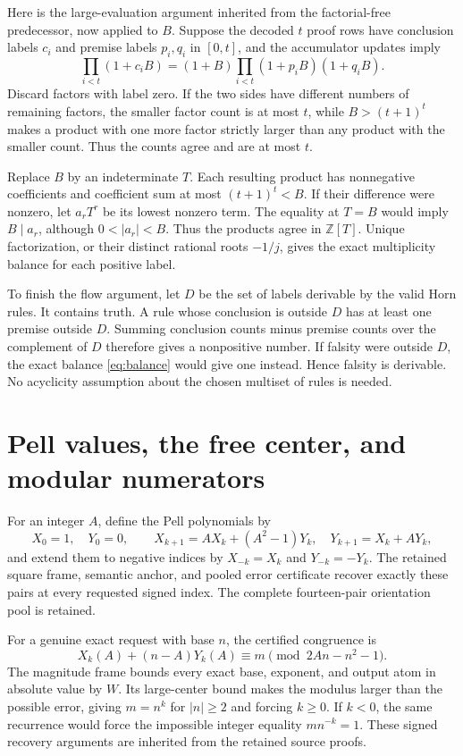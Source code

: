 \documentclass[11pt]{article}
\theoremstyle{remark}\newtheorem{remark}[theorem]{Remark}
\newcommand{\Z}{\mathbb Z}\newcommand{\N}{\mathbb N}
\newcommand{\abs}[1]{\lvert #1\rvert}
\begin{document}
Here is the large-evaluation argument inherited from the factorial-free
predecessor, now applied to $B$. Suppose the decoded $t$ proof rows
have conclusion labels $c_i$ and premise labels $p_i,q_i$ in $[0,t]$,
and the accumulator updates imply
\begin{equation}\label{eq:balance}
 \prod_{i<t}(1+c_iB)
 =(1+B)\prod_{i<t}(1+p_iB)(1+q_iB).
\end{equation}
Discard factors with label zero. If the two sides have different numbers
of remaining factors, the smaller factor count is at most $t$, while
$B>(t+1)^t$ makes a product with one more factor strictly larger than
any product with the smaller count. Thus the counts agree and are at
most $t$.

Replace $B$ by an indeterminate $T$. Each resulting product has
nonnegative coefficients and coefficient sum at most $(t+1)^t<B$.
If their difference were nonzero, let $a_rT^r$ be its lowest nonzero
term. The equality at $T=B$ would imply $B\mid a_r$, although
$0<\abs{a_r}<B$. Thus the products agree in $\Z[T]$. Unique
factorization, or their distinct rational roots $-1/j$, gives the
exact multiplicity balance for each positive label.

To finish the flow argument, let $D$ be the set of labels derivable by
the valid Horn rules. It contains truth. A rule whose conclusion is
outside $D$ has at least one premise outside $D$. Summing conclusion
counts minus premise counts over the complement of $D$ therefore gives
a nonpositive number. If falsity were outside $D$, the exact balance
\eqref{eq:balance} would give one instead. Hence falsity is derivable.
No acyclicity assumption about the chosen multiset of rules is needed.

\section{Pell values, the free center, and modular numerators}

For an integer $A$, define the Pell polynomials by
\[
 X_0=1,\quad Y_0=0,\qquad
 X_{k+1}=AX_k+(A^2-1)Y_k,\quad Y_{k+1}=X_k+AY_k,
\]
and extend them to negative indices by $X_{-k}=X_k$ and $Y_{-k}=-Y_k$.
The retained square frame, semantic anchor, and pooled error certificate
recover exactly these pairs at every requested signed index. The
complete fourteen-pair orientation pool is retained.

For a genuine exact request with base $n$, the certified congruence is
\[
 X_k(A)+(n-A)Y_k(A)\equiv m
 \pmod{2An-n^2-1}.
\]
The magnitude frame bounds every exact base, exponent, and output atom
in absolute value by $W$. Its large-center bound makes the modulus
larger than the possible error, giving $m=n^k$ for $\abs n\ge2$ and
forcing $k\ge0$. If $k<0$, the same recurrence would force the
impossible integer equality $m n^{-k}=1$. These signed recovery
arguments are inherited from the retained source proofs.
\end{document}
